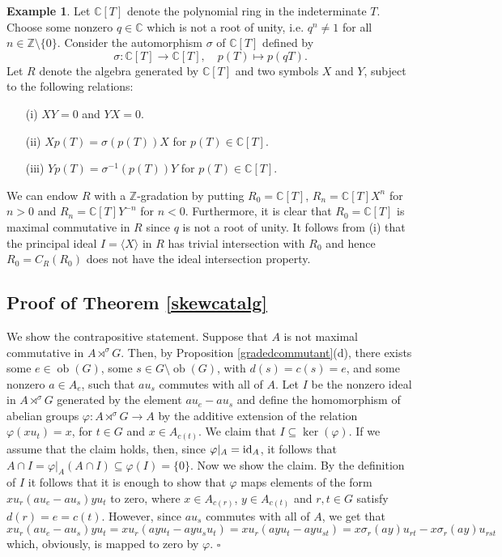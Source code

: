 \documentclass[11pt,leqno]{amsart}
\theoremstyle{plain}
\theoremstyle{definition}
\newtheorem{exmp}{Example}
\newcommand{\Z}{\mathbb{Z}}
\newcommand{\C}{\mathbb{C}}
\DeclareMathOperator{\ob}{ob}
\begin{document}
\begin{exmp}
Let $\C[T]$ denote the polynomial ring in the indeterminate $T$. Choose some nonzero $q\in \C$ which is not a root of unity, i.e. $q^n \neq 1$ for all $n \in \Z \setminus \{0\}$. Consider the automorphism $\sigma$ of $\C[T]$ defined by
\begin{displaymath}
	\sigma : \C[T] \to \C[T], \quad p(T) \mapsto p(qT).
\end{displaymath}
Let $R$ denote the algebra generated by $\C[T]$ and two symbols $X$ and $Y$, subject to the following relations:
\begin{enumerate}
	\item[(i)] $XY=0$ and $YX=0$.
	\item[(ii)] $X p(T) = \sigma(p(T)) X$ for $p(T) \in \C[T]$.
	\item[(iii)] $Y p(T) = \sigma^{-1}(p(T)) Y$ for $p(T) \in \C[T]$.
\end{enumerate}
We can endow $R$ with a $\Z$-gradation by putting $R_0 = \C[T]$, $R_n = \C[T] X^n$ for $n>0$ and $R_n = \C[T] Y^{-n}$ for $n<0$. Furthermore, it is clear that $R_0 = \C[T]$ is maximal commutative in $R$ since $q$ is not a root of unity. It follows from (i) that the principal ideal $I=\langle X \rangle$ in $R$ has trivial intersection with $R_0$ and hence $R_0=C_R(R_0)$ does not have the ideal intersection property.
\end{exmp}

\subsection*{Proof of Theorem \ref{skewcatalg}}
We show the contrapositive statement. Suppose that $A$ is not
maximal commutative in $A \rtimes^{\sigma} G$.
Then, by Proposition \ref{gradedcommutant}(d),
there exists some $e \in \ob(G)$, some $s \in G \setminus \ob(G)$,
with $d(s)=c(s)=e$, and some nonzero $a \in A_e$, such that
$a u_s$ commutes with all of $A$.
Let $I$ be the nonzero ideal in $A \rtimes^{\sigma} G$ generated
by the element $a u_e - a u_s$
and define the homomorphism of abelian groups
$\varphi : A \rtimes^{\sigma} G \rightarrow A$
by the additive extension of the relation
$\varphi(x u_t) = x$, for $t \in G$ and $x \in A_{c(t)}$.
We claim that $I \subseteq \ker(\varphi)$.
If we assume that the claim holds, then,
since $\varphi |_A = {\rm id}_A$,
it follows that
$A \cap I = \varphi |_A (A \cap I)
\subseteq \varphi(I) = \{ 0 \}$.
Now we show the claim.
By the definition of $I$ it follows that
it is enough to show that $\varphi$
maps elements of the form
$x u_r (a u_e - a u_s) y u_t$ to zero,
where $x \in A_{c(r)}$, $y \in A_{c(t)}$
and $r,t \in G$ satisfy $d(r)=e=c(t)$.
However, since $au_s$ commutes with all
of $A$, we get that
$x u_r (a u_e - a u_s) y u_t =
x u_r (a y u_t - ay u_s u_t)=
x u_r (a y u_t - ay u_{st})=
x \sigma_r(ay) u_{rt} - x \sigma_r(ay) u_{rst}$
which, obviously, is mapped to zero by $\varphi$.
{\hfill $\square$}
\end{document}
